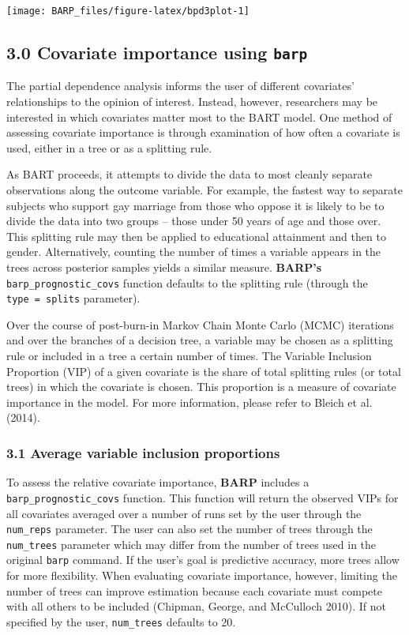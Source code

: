 \documentclass[]{article}
\begin{document}
\begin{center}\texttt{[image: BARP\_files/figure-latex/bpd3plot-1]} \end{center}

\subsection{\texorpdfstring{3.0 Covariate importance using
\texttt{barp}}{3.0 Covariate importance using barp}}\label{covariate-importance-using-barp}

The partial dependence analysis informs the user of different
covariates' relationships to the opinion of interest. Instead, however,
researchers may be interested in which covariates matter most to the
BART model. One method of assessing covariate importance is through
examination of how often a covariate is used, either in a tree or as a
splitting rule.

As BART proceeds, it attempts to divide the data to most cleanly
separate observations along the outcome variable. For example, the
fastest way to separate subjects who support gay marriage from those who
oppose it is likely to be to divide the data into two groups -- those
under 50 years of age and those over. This splitting rule may then be
applied to educational attainment and then to gender. Alternatively,
counting the number of times a variable appears in the trees across
posterior samples yields a similar measure. \textbf{BARP's}
\texttt{barp\_prognostic\_covs} function defaults to the splitting rule
(through the
\texttt{type\ =\ \textquotesingle{}splits\textquotesingle{}} parameter).

Over the course of post-burn-in Markov Chain Monte Carlo (MCMC)
iterations and over the branches of a decision tree, a variable may be
chosen as a splitting rule or included in a tree a certain number of
times. The Variable Inclusion Proportion (VIP) of a given covariate is
the share of total splitting rules (or total trees) in which the
covariate is chosen. This proportion is a measure of covariate
importance in the model. For more information, please refer to Bleich et
al. (2014).

\subsubsection{3.1 Average variable inclusion
proportions}\label{average-variable-inclusion-proportions}

To assess the relative covariate importance, \textbf{BARP} includes a
\texttt{barp\_prognostic\_covs} function. This function will return the
observed VIPs for all covariates averaged over a number of runs set by
the user through the \texttt{num\_reps} parameter. The user can also set
the number of trees through the \texttt{num\_trees} parameter which may
differ from the number of trees used in the original \texttt{barp}
command. If the user's goal is predictive accuracy, more trees allow for
more flexibility. When evaluating covariate importance, however,
limiting the number of trees can improve estimation because each
covariate must compete with all others to be included (Chipman, George,
and McCulloch 2010). If not specified by the user, \texttt{num\_trees}
defaults to 20.
\end{document}
